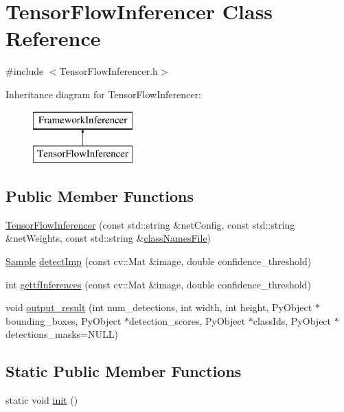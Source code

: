 \hypertarget{class_tensor_flow_inferencer}{}\section{Tensor\+Flow\+Inferencer Class Reference}
\label{class_tensor_flow_inferencer}


{\ttfamily \#include $<$Tensor\+Flow\+Inferencer.\+h$>$}

Inheritance diagram for Tensor\+Flow\+Inferencer\+:\begin{figure}[H]
\begin{center}
\leavevmode
\includegraphics[height=2.000000cm]{class_tensor_flow_inferencer}
\end{center}
\end{figure}
\subsection*{Public Member Functions}
\begin{DoxyCompactItemize}
\item 
\hyperlink{class_tensor_flow_inferencer_a78ef7a49464aeb0d846910cda36b33cc}{Tensor\+Flow\+Inferencer} (const std\+::string \&net\+Config, const std\+::string \&net\+Weights, const std\+::string \&\hyperlink{class_framework_inferencer_abdb304d43262f48e0438a55778c7540f}{class\+Names\+File})
\item 
\hyperlink{struct_sample}{Sample} \hyperlink{class_tensor_flow_inferencer_ae8b603ab05273a9ec5fee720f23d0c58}{detect\+Imp} (const cv\+::\+Mat \&image, double confidence\+\_\+threshold)
\item 
int \hyperlink{class_tensor_flow_inferencer_af5d1c756798e075bc44f51857571143a}{gettf\+Inferences} (const cv\+::\+Mat \&image, double confidence\+\_\+threshold)
\item 
void \hyperlink{class_tensor_flow_inferencer_a57f6622a03e8ee69e6f2ef17e09b3545}{output\+\_\+result} (int num\+\_\+detections, int width, int height, Py\+Object $\ast$bounding\+\_\+boxes, Py\+Object $\ast$detection\+\_\+scores, Py\+Object $\ast$class\+Ids, Py\+Object $\ast$detections\+\_\+masks=N\+U\+LL)
\end{DoxyCompactItemize}
\subsection*{Static Public Member Functions}
\begin{DoxyCompactItemize}
\item 
static void \hyperlink{class_tensor_flow_inferencer_a301f29e30c8f18bc71ca627a11af5cc6}{init} ()
\end{DoxyCompactItemize}
